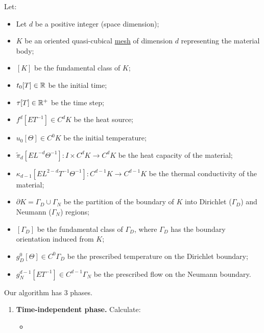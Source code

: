 \begin{algorithm}
  \label{idec/diffusion/discrete/transient/mixed_weak_solve_trapezoidal-algorithm}
  Let:
  \begin{itemize}
    \item
      Let $d$ be a positive integer (space dimension);
    \item
      $K$ be an oriented quasi-cubical \hyperref[idec:mesh:definition]{mesh} of
      dimension $d$ representing the material body;
    \item
      $[K]$ be the fundamental class of $K$;
    \item
      $t_0 [T] \in \mathbb{R}$ be the initial time;
    \item
      $\tau [T] \in \mathbb{R}^+$ be the time step;
    \item
      $f^d [E T^{-1}] \in C^d K$ be the heat source;
    \item
      $u_0 [\Theta] \in C^0 K$ be the initial temperature;
    \item
      $\tilde{\pi}_d [E L^{-d} \Theta^{-1}] \colon I \times C^d K \to C^d K$
      be the heat capacity of the material;
    \item
      $\kappa_{d - 1} [E L^{2 - d} T^{-1} \Theta^{-1}]
        \colon C^{d - 1} K \to C^{d - 1} K$
      be the thermal conductivity of the material;
    \item
      $\partial K = \Gamma_D \cup \Gamma_N$ be the partition of the boundary of
      $K$ into Dirichlet ($\Gamma_D$) and Neumann ($\Gamma_N$) regions;
    \item
      $[\Gamma_D]$ be the fundamental class of $\Gamma_D$, where $\Gamma_D$
      has the boundary orientation induced from $K$;
    \item
      $g_D^0 [\Theta] \in C^0 \Gamma_D$
      be the prescribed temperature on the Dirichlet boundary;
    \item
      $g_N^{d - 1} [E T^{-1}] \in C^{d - 1} \Gamma_N$
      be the prescribed flow on the Neumann boundary.
  \end{itemize}
  Our algorithm has $3$ phases.
  \begin{enumerate}
    \item
      \textbf{Time-independent phase.}
      Calculate:
      \begin{itemize}
        \item

\end{itemize}
\end{enumerate}
\end{algorithm}

